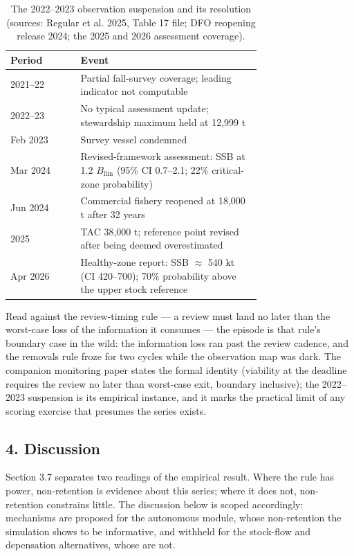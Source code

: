 \documentclass[11pt]{article}
\begin{document}
\begin{table}[h]
\centering
\small
\begin{tabular}{@{}lp{0.72\linewidth}@{}}
\toprule
Period & Event \\
\midrule
2021--22 & Partial fall-survey coverage; leading indicator not computable \\
2022--23 & No typical assessment update; stewardship maximum held at 12{,}999 t \\
Feb 2023 & Survey vessel condemned \\
Mar 2024 & Revised-framework assessment: SSB at 1.2 \(B_{\mathrm{lim}}\) (95\% CI 0.7--2.1; 22\% critical-zone probability) \\
Jun 2024 & Commercial fishery reopened at 18{,}000 t after 32 years \\
2025 & TAC 38{,}000 t; reference point revised after being deemed overestimated \\
Apr 2026 & Healthy-zone report: SSB $\approx$ 540 kt (CI 420--700); 70\% probability above the upper stock reference \\
\bottomrule
\end{tabular}
\caption{The 2022--2023 observation suspension and its resolution
(sources: Regular et al. 2025, Table 17 file; DFO reopening release
2024; the 2025 and 2026 assessment coverage).}
\label{cod-tab:suspension}
\end{table}

Read against the review-timing rule --- a review must land no later than
the worst-case loss of the information it consumes --- the episode is
that rule's boundary case in the wild: the information loss ran past the
review cadence, and the removals rule froze for two cycles while the
observation map was dark. The companion monitoring paper states the formal identity (viability at the deadline requires the review no
later than worst-case exit, boundary inclusive); the 2022--2023
suspension is its empirical instance, and it marks the practical limit
of any scoring exercise that presumes the series exists.

\subsection{4. Discussion}\label{cod-discussion}

Section 3.7 separates two readings of the empirical result. Where the
rule has power, non-retention is evidence about this series; where it
does not, non-retention constrains little. The discussion below is
scoped accordingly: mechanisms are proposed for the autonomous module,
whose non-retention the simulation shows to be informative, and withheld
for the stock-flow and depensation alternatives, whose are not.
\end{document}
